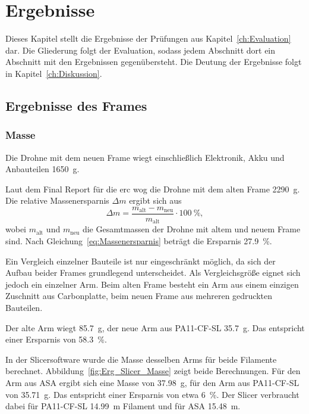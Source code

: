 \chapter{Ergebnisse}
\label{ch:Ergebnisse}

Dieses Kapitel stellt die Ergebnisse der Prüfungen aus Kapitel~\ref{ch:Evaluation} dar. Die Gliederung folgt der Evaluation, sodass jedem Abschnitt dort ein Abschnitt mit den Ergebnissen gegenübersteht. Die Deutung der Ergebnisse folgt in Kapitel~\ref{ch:Diskussion}.

    \section{Ergebnisse des Frames}
    \label{sec:Erg_Frame}

        \subsection{Masse}
        \label{sec:Erg_Frame_Masse}

        Die Drohne mit dem neuen Frame wiegt einschließlich Elektronik, Akku und Anbauteilen \SI{1650}{\gram}.
        
        Laut dem Final Report für die \gls{erc} wog die Drohne mit dem alten Frame \SI{2290}{\gram}. Die relative Massenersparnis $\Delta m$ ergibt sich aus %
        \begin{equation}
            \Delta m = \frac{m_{\mathrm{alt}} - m_{\mathrm{neu}}}{m_{\mathrm{alt}}} \cdot \SI{100}{\percent} ,
            \label{eq:Massenersparnis}
        \end{equation}
        wobei $m_{\mathrm{alt}}$ und $m_{\mathrm{neu}}$ die Gesamtmassen der Drohne mit altem und neuem Frame sind. Nach Gleichung~\eqref{eq:Massenersparnis} beträgt die Ersparnis \SI{27,9}{\percent}.

        Ein Vergleich einzelner Bauteile ist nur eingeschränkt möglich, da sich der Aufbau beider Frames grundlegend unterscheidet. Als Vergleichsgröße eignet sich jedoch ein einzelner Arm. Beim alten Frame besteht ein Arm aus einem einzigen Zuschnitt aus Carbonplatte, beim neuen Frame aus mehreren gedruckten Bauteilen.

        Der alte Arm wiegt \SI{85,7}{\gram}, der neue Arm aus PA11-CF-SL \SI{35,7}{\gram}. Das entspricht einer Ersparnis von \SI{58,3}{\percent}.

        In der Slicersoftware wurde die Masse desselben Arms für beide Filamente berechnet. Abbildung~\ref{fig:Erg_Slicer_Masse} zeigt beide Berechnungen. Für den Arm aus ASA ergibt sich eine Masse von \SI{37,98}{\gram}, für den Arm aus PA11-CF-SL von \SI{35,71}{\gram}. Das entspricht einer Ersparnis von etwa \SI{6}{\percent}. Der Slicer verbraucht dabei für PA11-CF-SL \SI{14,99}{\metre} Filament und für ASA \SI{15,48}{\metre}.

